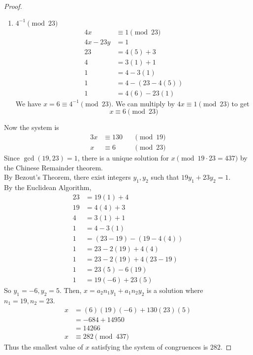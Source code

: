 \documentclass[11pt]{article}
\theoremstyle{definition}
\begin{document}
\begin{enumerate}
\begin{proof}
\begin{enumerate}
            \item $4^{-1}\pmod{23}$
            \begin{align*}
                4x &\equiv 1\pmod{23} \\
                4x-23y &= 1 \\
                23 &= 4(5) + 3 \\
                4 &= 3(1) + 1 \\
                1 &= 4-3(1) \\
                1 &= 4-(23-4(5)) \\
                1 &= 4(6) - 23(1)
            \end{align*}
            We have $x=6\equiv 4^{-1}\pmod{23}$. We can multiply by $4x\equiv 1\pmod{23}$ to get
            \[ x\equiv 6\pmod{23} \]
        \end{enumerate}
        Now the system is 
        \begin{alignat*}{3}
            x &\equiv 130 &&\pmod{19} \\
            x &\equiv 6 &&\pmod{23}
        \end{alignat*}
        Since $\gcd(19,23)=1$, there is a unique solution for $x\pmod{19\cdot 23=437}$
        by the Chinese Remainder theorem. \\
        By Bezout's Theorem, there exist integers $y_1,y_2$ such that $19y_1+23y_2=1$. \\
        By the Euclidean Algorithm,
        \begin{align*}
            23 &= 19(1) + 4 \\
            19 &= 4(4) + 3 \\
            4 &= 3(1) + 1 \\
            1 &= 4-3(1) \\
            1 &= (23-19) - (19-4(4)) \\
            1 &= 23-2(19) + 4(4) \\
            1 &= 23-2(19) + 4(23-19) \\
            1 &= 23(5) - 6(19) \\
            1 &= 19(-6) + 23(5)
        \end{align*}
        So $y_1=-6,y_2=5$. Then, $x=a_2n_1y_1+a_1n_2y_2$ is a solution where $n_1=19,n_2=23$.
        \begin{align*}
            x &= (6)(19)(-6) + 130(23)(5) \\
            &= -684 + 14950 \\
            &= 14266 \\
            x &\equiv 282\pmod{437}
        \end{align*}
        Thus the smallest value of $x$ satisfying the system of congruences is $282$.


\end{proof}
\end{enumerate}
\end{document}
